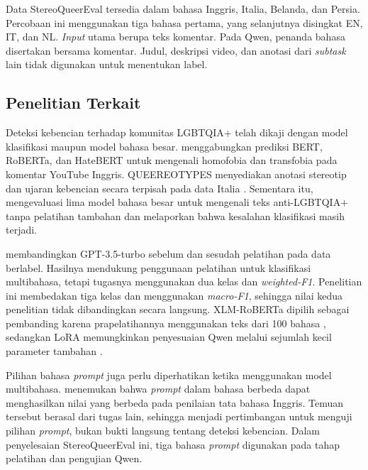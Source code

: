 \documentclass[11pt]{article}
\begin{document}
Data StereoQueerEval tersedia dalam bahasa Inggris, Italia, Belanda, dan Persia. Percobaan ini menggunakan tiga bahasa pertama, yang selanjutnya disingkat EN, IT, dan NL. \textit{Input} utama berupa teks komentar. Pada Qwen, penanda bahasa disertakan bersama komentar. Judul, deskripsi video, dan anotasi dari \textit{subtask} lain tidak digunakan untuk menentukan label.

\subsection{Penelitian Terkait}
Deteksi kebencian terhadap komunitas LGBTQIA+ telah dikaji dengan model klasifikasi maupun model bahasa besar. \citet{nozza-2022-nozza} menggabungkan prediksi BERT, RoBERTa, dan HateBERT untuk mengenali homofobia dan transfobia pada komentar YouTube Inggris. QUEEREOTYPES menyediakan anotasi stereotip dan ujaran kebencian secara terpisah pada data Italia \citep{cignarella-etal-2024-queereotypes}. Sementara itu, \citet{nguyen-etal-2025-leveraging} mengevaluasi lima model bahasa besar untuk mengenali teks anti-LGBTQIA+ tanpa pelatihan tambahan dan melaporkan bahwa kesalahan klasifikasi masih terjadi.

\citet{chan-etal-2024-hate} membandingkan GPT-3.5-turbo sebelum dan sesudah pelatihan pada data berlabel. Hasilnya mendukung penggunaan pelatihan untuk klasifikasi multibahasa, tetapi tugasnya menggunakan dua kelas dan \textit{weighted-F1}. Penelitian ini membedakan tiga kelas dan menggunakan \textit{macro-F1}, sehingga nilai kedua penelitian tidak dibandingkan secara langsung. XLM-RoBERTa dipilih sebagai pembanding karena prapelatihannya menggunakan teks dari 100 bahasa \citep{conneau-etal-2020-unsupervised}, sedangkan LoRA memungkinkan penyesuaian Qwen melalui sejumlah kecil parameter tambahan \citep{hu-etal-2021-lora}.

Pilihan bahasa \textit{prompt} juga perlu diperhatikan ketika menggunakan model multibahasa. \citet{behzad-etal-2024-ask} menemukan bahwa \textit{prompt} dalam bahasa berbeda dapat menghasilkan nilai yang berbeda pada penilaian tata bahasa Inggris. Temuan tersebut berasal dari tugas lain, sehingga menjadi pertimbangan untuk menguji pilihan \textit{prompt}, bukan bukti langsung tentang deteksi kebencian. Dalam penyelesaian StereoQueerEval ini, tiga bahasa \textit{prompt} digunakan pada tahap pelatihan dan pengujian Qwen.
\end{document}
